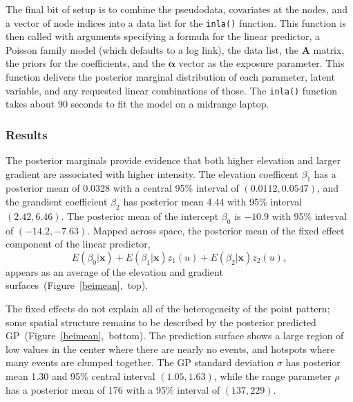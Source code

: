 \documentclass[]{interact}
\begin{document}
The final bit of setup is to combine the pseudodata, covariates at the nodes,
and a vector of node indices into a data list for the \texttt{inla()} function.
This function is then called with arguments specifying a formula for the
linear predictor, a Poisson family model (which defaults to a log link), the
data list, the \(\mathbf{A}\) matrix, the priors for the coefficients, and the
\(\boldsymbol{\alpha}\) vector as the exposure parameter. This function
delivers the posterior marginal distribution of each parameter, latent
variable, and any requested linear combinations of those. The \texttt{inla()}
function takes about 90 seconds to fit the model on a midrange laptop.


\subsubsection{Results}
\label{beiresults}

The posterior marginals provide evidence that both higher elevation and larger
gradient are associated with higher intensity. The elevation coefficent
\(\beta_{1}\) has a posterior mean of 0.0328 with a central 95\% interval of
\((0.0112, 0.0547)\), and the grandient coefficient \(\beta_{2}\) has posterior
mean 4.44 with 95\% interval \((2.42, 6.46)\). The posterior mean of the
intercept \(\beta_{0}\) is \(-10.9\) with 95\% interval of \((-14.2, -7.63)\).
Mapped across space, the posterior mean of the fixed effect component of the
linear predictor,
\begin{displaymath}
E(\beta_{0} | \mathbf{x}) + E(\beta_{1} | \mathbf{x}) z_{1}(u)
+ E(\beta_{2} | \mathbf{x}) z_{2}(u),
\end{displaymath}
appears as an average of the elevation and gradient
surfaces~(Figure~\ref{beimean},~top).

The fixed effects do not explain all of the heterogeneity of the point pattern;
some spatial structure remains to be described by the posterior predicted
GP~(Figure~\ref{beimean},~bottom). The prediction surface shows a large region
of low values in the center where there are nearly no events, and hotspots
where many events are clumped together. The GP standard deviation \(\sigma\)
has posterior mean 1.30 and 95\% central interval \((1.05, 1.63)\), while the
range parameter \(\rho\) has a posterior mean of 176 with a 95\% interval of
\((137, 229)\).
\end{document}
